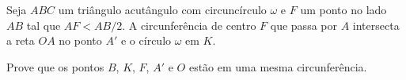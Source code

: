Seja $ABC$ um triângulo acutângulo com circuncírculo $\omega$ e $F$ um ponto no lado $AB$ tal que $AF < AB/2$. A circunferência de centro $F$ que passa por $A$ intersecta a reta $OA$ no ponto $A'$ e o círculo $\omega$ em $K$.

Prove que os pontos $B$, $K$, $F$, $A'$ e $O$ estão em uma mesma circunferência.
